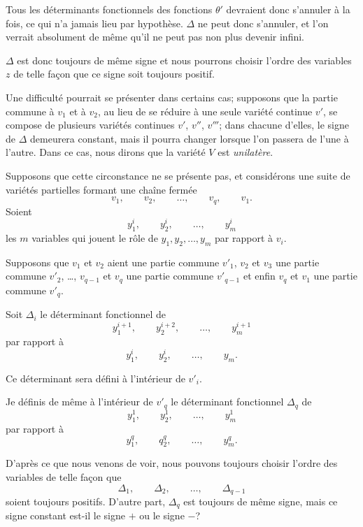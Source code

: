 \documentclass{article}
\begin{document}
Tous les déterminants fonctionnels des fonctions $\theta'$ devraient donc s'annuler à la fois, ce qui n'a jamais lieu par hypothèse. $\Delta$ ne peut donc s'annuler, et l'on verrait absolument de même qu'il ne peut pas non plus devenir infini.

$\Delta$ est donc toujours de même signe et nous pourrons choisir l'ordre des variables $z$ de telle façon que ce signe soit toujours positif.

Une difficulté pourrait se présenter dans certains cas; supposons que la partie commune à $v_{1}$ et à $v_{2}$, au lieu de se réduire à une seule variété continue $v'$, se compose de plusieurs variétés continues $v'$, $v''$, $v'''$; dans chacune d'elles, le signe de $\Delta$ demeurera constant, mais il pourra changer lorsque l'on passera de l'une à l'autre. Dans ce cas, nous dirons que la variété $V$ est \emph{unilatère}.

Supposons que cette circonstance ne se présente pas, et considérons une suite de variétés partielles formant une chaîne fermée
\[
v_{1}, \qquad v_{2}, \qquad \ldots, \qquad v_{q}, \qquad v_{1}.
\]
Soient
\[
y^{i}_{1}, \qquad y^{i}_{2}, \qquad \ldots, \qquad y^{i}_{m}
\]
les $m$ variables qui jouent le rôle de $y_{1}, y_{2}, \ldots, y_{m}$ par rapport à $v_{i}$.

Supposons que $v_{1}$ et $v_{2}$ aient une partie commune $v'_{1}$, $v_{2}$ et $v_{3}$ une partie commune $v'_{2}$, \ldots, $v_{q-1}$ et $v_{q}$ une partie commune $v'_{q-1}$ et enfin $v_{q}$ et $v_{1}$ une partie commune $v'_{q}$.

Soit $\Delta_{i}$ le déterminant fonctionnel de
\[
y^{i+1}_{1}, \qquad y^{i+2}_{2}, \qquad \ldots, \qquad y^{i+1}_{m}
\]
par rapport à
\[
y^{i}_{1}, \qquad y^{i}_{2}, \qquad \ldots, \qquad y_{m}.
\]

Ce déterminant sera défini à l'intérieur de $v'_{i}$.

Je définis de même à l'intérieur de $v'_{q}$ le déterminant fonctionnel $\Delta_{q}$ de
\[
y^{1}_{1}, \qquad y^{1}_{2}, \qquad \ldots, \qquad y^{1}_{m}
\]
par rapport à
\[
y^{q}_{1}, \qquad q^{q}_{2}, \qquad \ldots, \qquad y^{q}_{m}.
\]

D'après ce que nous venons de voir, nous pouvons toujours choisir l'ordre des variables de telle façon que
\[
\Delta_{1}, \qquad \Delta_{2}, \qquad \ldots, \qquad \Delta_{q-1}
\]
soient toujours positifs. D'autre part, $\Delta_{q}$ est toujours de même signe, mais ce signe constant est-il le signe $+$ ou le signe $-$?
\end{document}
